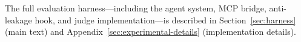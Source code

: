 The full evaluation harness---including the agent system, MCP bridge, anti-leakage hook, and judge implementation---is described in Section~\ref{sec:harness} (main text) and Appendix~\ref{sec:experimental-details} (implementation details).
